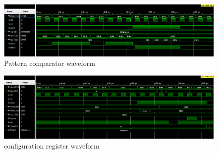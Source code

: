 \documentclass[10pt]{report}
\begin{document}
\begin{figure}[h]
\includegraphics[width=\textwidth,height=\textwidth,keepaspectratio]{pattern_comparator.png}
\caption{Pattern comparator waveform}
\end{figure}

\begin{figure}[h]
\includegraphics[width=\textwidth,height=\textwidth,keepaspectratio]{configuration_register.png}
\caption{configuration register waveform}
\end{figure}
\end{document}
